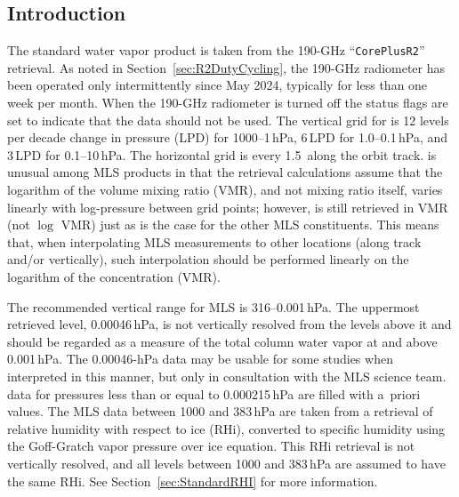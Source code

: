 
\subsection{Introduction}

The standard water vapor product is taken from the 190\nobreakdash-GHz ``\texttt{CorePlusR2}'' retrieval. As noted in Section~\ref{sec:R2DutyCycling}, the 190\nobreakdash-GHz radiometer has been operated only intermittently since May 2024, typically for less than one week per month. When the \mbox{190-GHz} radiometer is turned off the  status flags are set to indicate that the data should not be used. The vertical grid for  is 12 levels per decade change in pressure (LPD) for 1000--1\,hPa, 6\,LPD for 1.0--0.1\,hPa, and 3\,LPD for 0.1--10\,hPa. The horizontal grid is every 1.5\degsym\ along the orbit track.  is unusual among MLS products in that the retrieval calculations assume that the logarithm of the volume mixing ratio (VMR), and not mixing ratio itself, varies linearly with log-pressure between grid points; however,  is still retrieved in VMR (not $\log$ VMR) just as is the case for the other MLS constituents. This means that, when interpolating MLS measurements to other locations (along track and/or vertically), such interpolation should be performed linearly on the logarithm of the  concentration (VMR).

The recommended vertical range for MLS \thisv {} is 316--0.001\,hPa.  The uppermost retrieved level, 0.00046\,hPa, is not vertically resolved from the levels above it and should be regarded as a measure of the total column water vapor at and above 0.001\,hPa. The 0.00046\nobreakdash-hPa data may be usable for some studies when interpreted in this manner, but only in consultation with the MLS science team.  data for pressures less than or equal to 0.000215\,hPa are filled with a~priori values. The MLS  data between 1000 and 383\,hPa are taken from a retrieval of relative humidity with respect to ice (RHi), converted to specific humidity using the Goff-Gratch vapor pressure over ice equation. This RHi retrieval is not vertically resolved, and all levels between 1000 and 383\,hPa are assumed to have the same RHi. See Section~\ref{sec:StandardRHI} for more information.

